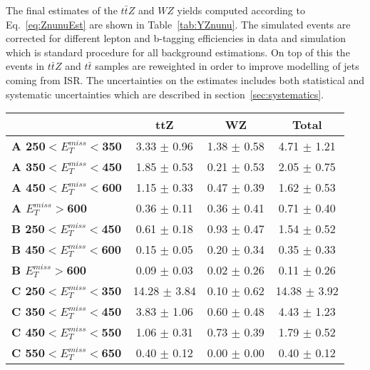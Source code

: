 The final estimates of the $t\bar{t}Z$ and $WZ$ yields computed according to Eq.~\ref{eq:ZnunuEst} are shown in Table~\ref{tab:YZnunu}. The simulated events are corrected for different lepton and b-tagging efficiencies in data and simulation which is standard procedure for all background estimations. On top of this the events in $t\bar{t}Z$ and $t\bar{t}$ samples are reweighted in order to improve modelling of jets coming from ISR. The uncertainties on the estimates includes both statistical and systematic uncertainties which are described in section~\ref{sec:systematics}.


\begin{table}[h]
\begin{center}
\begin{tabular}{|l|ccc|}
\hline
&
\textbf{ttZ}    &
\textbf{WZ}     &
\textbf{Total}  \\
\hline
\textbf{ A 250$<E_T^{miss}<$350}         & 3.33 $\pm$ 0.96       & 1.38 $\pm$ 0.58       & 4.71 $\pm$ 1.21       \\
\textbf{ A 350$<E_T^{miss}<$450}         & 1.85 $\pm$ 0.53       & 0.21 $\pm$ 0.53       & 2.05 $\pm$ 0.75       \\
\textbf{ A 450$<E_T^{miss}<$600}         & 1.15 $\pm$ 0.33       & 0.47 $\pm$ 0.39       & 1.62 $\pm$ 0.53       \\
\textbf{ A $E_T^{miss}>$600}     & 0.36 $\pm$ 0.11       & 0.36 $\pm$ 0.41       & 0.71 $\pm$ 0.40       \\
\textbf{ B 250$<E_T^{miss}<$450}         & 0.61 $\pm$ 0.18       & 0.93 $\pm$ 0.47       & 1.54 $\pm$ 0.52       \\
\textbf{ B 450$<E_T^{miss}<$600}         & 0.15 $\pm$ 0.05       & 0.20 $\pm$ 0.34       & 0.35 $\pm$ 0.33       \\
\textbf{ B $E_T^{miss}>$600}     & 0.09 $\pm$ 0.03       & 0.02 $\pm$ 0.26       & 0.11 $\pm$ 0.26       \\
\textbf{ C 250$<E_T^{miss}<$350}         & 14.28 $\pm$ 3.84      & 0.10 $\pm$ 0.62       & 14.38 $\pm$ 3.92      \\
\textbf{ C 350$<E_T^{miss}<$450}         & 3.83 $\pm$ 1.06       & 0.60 $\pm$ 0.48       & 4.43 $\pm$ 1.23       \\
\textbf{ C 450$<E_T^{miss}<$550}         & 1.06 $\pm$ 0.31       & 0.73 $\pm$ 0.39       & 1.79 $\pm$ 0.52       \\
\textbf{ C 550$<E_T^{miss}<$650}         & 0.40 $\pm$ 0.12       & 0.00 $\pm$ 0.00       & 0.40 $\pm$ 0.12       \\

\end{tabular}
\end{center}
\end{table}

